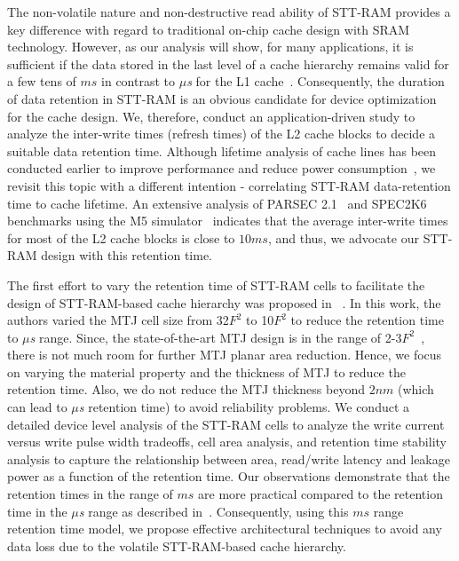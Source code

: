 The non-volatile nature and non-destructive read ability of STT-RAM provides a key difference with
regard to traditional on-chip cache design with SRAM technology. However, as our analysis will show,
for many applications, it is sufficient if the data stored in the last level of a cache hierarchy
remains valid for a few tens of $ms$ in contrast to {\it $\mu$s} for the L1 cache~\cite{3t1d-cache}.
Consequently, the duration of data retention in STT-RAM
is an obvious candidate for device optimization for the cache design. We, therefore, conduct an
application-driven study to analyze the inter-write times (refresh times) of the L2 cache blocks to decide a suitable
data retention time. Although lifetime analysis of cache lines has been conducted earlier to
improve performance and reduce power consumption~\cite{cache-decay-2001,3t1d-cache}, we revisit this
topic with a different intention - correlating STT-RAM data-retention time to cache lifetime. An
extensive analysis of PARSEC 2.1~\cite{bienia11benchmarking} and
SPEC2K6~\cite{spec} benchmarks using the M5 simulator~\cite{M5} indicates that
the average inter-write times for most of the L2 cache blocks is close to $10ms$, and thus, we advocate
our STT-RAM design with this retention time.

The first effort to vary the retention time of STT-RAM cells to facilitate the design of STT-RAM-based
cache hierarchy was proposed in ~\cite{STTRAM:HPCA11}.
In this work, the authors varied the MTJ cell size from 32$F^2$ to 10$F^2$ to reduce
the retention time to {\it $\mu$s} range. Since, the state-of-the-art MTJ design is in the range of
2-3$F^2$~\cite{STTRAM:Grandis11}, there is not much room for further MTJ planar area reduction. 
Hence, we focus on varying the material property and the thickness of MTJ to reduce the retention time.
Also, we do not reduce the MTJ thickness beyond $2nm$ (which can lead to {\it $\mu$s} retention time) 
to avoid reliability problems. We conduct a detailed device level analysis of the
STT-RAM cells to analyze the write current versus write pulse width tradeoffs,
cell area analysis, and retention time stability analysis to capture the
relationship between area, read/write latency and leakage power as a function of the retention time.
Our observations demonstrate that the retention times in the range of $ms$ are more practical compared to the retention time in the {\it $\mu$s} range as described in~\cite{STTRAM:HPCA11}.
Consequently, using this $ms$ range retention time model, we propose effective
architectural techniques to avoid any data loss due to the volatile STT-RAM-based cache hierarchy.

